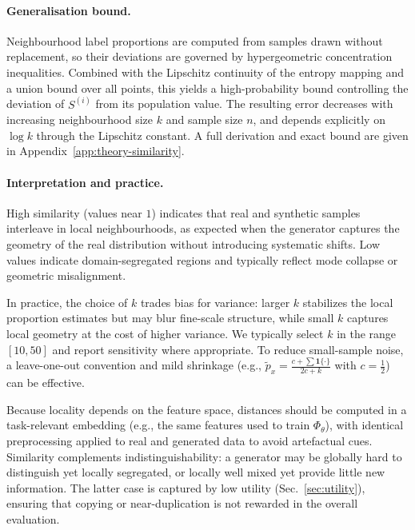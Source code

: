 \paragraph{Generalisation bound.}
Neighbourhood label proportions are computed from samples drawn without
replacement, so their deviations are governed by hypergeometric
concentration inequalities. Combined with the Lipschitz continuity of the
entropy mapping and a union bound over all points, this yields a
high-probability bound controlling the deviation of $S^{(i)}$ from its
population value. The resulting error decreases with increasing neighbourhood
size $k$ and sample size $n$, and depends explicitly on $\log k$ through the
Lipschitz constant. A full derivation and exact bound are given in
Appendix~\ref{app:theory-similarity}.

\paragraph{Interpretation and practice.}
High similarity (values near $1$) indicates that real and synthetic samples
interleave in local neighbourhoods, as expected when the generator captures
the geometry of the real distribution without introducing systematic shifts.
Low values indicate domain-segregated regions and typically reflect mode
collapse or geometric misalignment.

In practice, the choice of $k$ trades bias for variance: larger $k$ stabilizes
the local proportion estimates but may blur fine-scale structure, while small
$k$ captures local geometry at the cost of higher variance. We typically select
$k$ in the range $[10,50]$ and report sensitivity where appropriate. To reduce
small-sample noise, a leave-one-out convention and mild shrinkage
(e.g., $\tilde p_x=\frac{c+\sum \mathbf{1}\{\cdot\}}{2c+k}$ with
$c=\tfrac12$) can be effective.

Because locality depends on the feature space, distances should be computed in
a task-relevant embedding (e.g., the same features used to train
$\Phi_\theta$), with identical preprocessing applied to real and generated
data to avoid artefactual cues. Similarity complements indistinguishability:
a generator may be globally hard to distinguish yet locally segregated, or
locally well mixed yet provide little new information. The latter case is
captured by low utility (Sec.~\ref{sec:utility}), ensuring that copying or
near-duplication is not rewarded in the overall evaluation.

